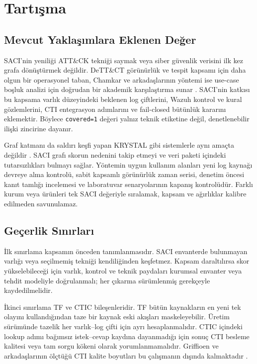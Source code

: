 \documentclass[conference]{IEEEtran}
\begin{document}
\section{Tartışma}
\subsection{Mevcut Yaklaşımlara Eklenen Değer}
SACI'nin yeniliği ATT\&CK tekniği saymak veya siber güvenlik verisini ilk kez grafa dönüştürmek değildir. DeTT\&CT görünürlük ve tespit kapsamı için daha olgun bir operasyonel taban, Chamkar ve arkadaşlarının yöntemi ise use-case boşluk analizi için doğrudan bir akademik karşılaştırma sunar \cite{dettect,chamkar2024}. SACI'nin katkısı bu kapsama varlık düzeyindeki beklenen log çiftlerini, Wazuh kontrol ve kural gözlemlerini, CTI entegrasyon adımlarını ve fail-closed bütünlük kararını eklemektir. Böylece \texttt{covered=1} değeri yalnız teknik etiketine değil, denetlenebilir ilişki zincirine dayanır.

Graf katmanı da saldırı keşfi yapan KRYSTAL gibi sistemlerle aynı amaçta değildir \cite{krystal2022}. SACI grafı skorun nedenini takip etmeyi ve veri paketi içindeki tutarsızlıkları bulmayı sağlar. Yöntemin uygun kullanım alanları yeni log kaynağı devreye alma kontrolü, sabit kapsamlı görünürlük zaman serisi, denetim öncesi kanıt tamlığı incelemesi ve laboratuvar senaryolarının kapanış kontrolüdür. Farklı kurum veya ürünleri tek SACI değeriyle sıralamak, kapsam ve ağırlıklar kalibre edilmeden savunulamaz.

\subsection{Geçerlik Sınırları}
İlk sınırlama kapsamın önceden tanımlanmasıdır. SACI envanterde bulunmayan varlığı veya seçilmemiş tekniği kendiliğinden keşfetmez. Kapsam daraltılırsa skor yükselebileceği için varlık, kontrol ve teknik paydaları kurumsal envanter veya tehdit modeliyle doğrulanmalı; her çıkarma sürümlenmiş gerekçeyle kaydedilmelidir.

İkinci sınırlama TF ve CTIC bileşenleridir. TF bütün kaynakların en yeni tek olayını kullandığından taze bir kaynak eski akışları maskeleyebilir. Üretim sürümünde tazelik her varlık--log çifti için ayrı hesaplanmalıdır. CTIC içindeki lookup adımı bağımsız istek--cevap kaydına dayanmadığı için sonuç CTI besleme kalitesi veya tam sorgu kökeni olarak yorumlanmamalıdır. Griffioen ve arkadaşlarının ölçtüğü CTI kalite boyutları bu çalışmanın dışında kalmaktadır \cite{griffioen2020}.
\end{document}

